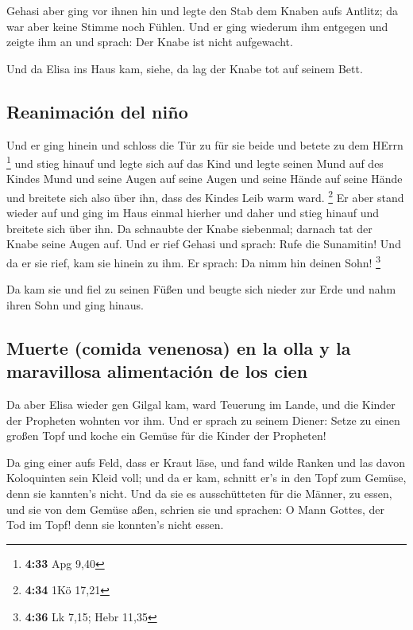  Gehasi aber ging vor ihnen hin und legte den Stab dem
Knaben aufs Antlitz; da war aber keine Stimme noch Fühlen. Und er ging
wiederum ihm entgegen und zeigte ihm an und sprach: Der Knabe ist nicht
aufgewacht.

 Und da Elisa ins Haus kam, siehe, da lag der Knabe tot
auf seinem Bett.

\hypertarget{reanimaciuxf3n-del-niuxf1o}{%
\subsection{Reanimación del niño}\label{reanimaciuxf3n-del-niuxf1o}}

 Und er ging hinein und schloss die Tür zu für sie beide
und betete zu dem HErrn \footnote{\textbf{4:33} Apg 9,40}
 und stieg hinauf und legte sich auf das Kind und legte
seinen Mund auf des Kindes Mund und seine Augen auf seine Augen und
seine Hände auf seine Hände und breitete sich also über ihn, dass des
Kindes Leib warm ward. \footnote{\textbf{4:34} 1Kö 17,21}
 Er aber stand wieder auf und ging im Haus einmal hierher
und daher und stieg hinauf und breitete sich über ihn. Da schnaubte der
Knabe siebenmal; darnach tat der Knabe seine Augen auf. 
Und er rief Gehasi und sprach: Rufe die Sunamitin! Und da er sie rief,
kam sie hinein zu ihm. Er sprach: Da nimm hin deinen Sohn! \footnote{\textbf{4:36}
  Lk 7,15; Hebr 11,35}

 Da kam sie und fiel zu seinen Füßen und beugte sich
nieder zur Erde und nahm ihren Sohn und ging hinaus.

\hypertarget{muerte-comida-venenosa-en-la-olla-y-la-maravillosa-alimentaciuxf3n-de-los-cien}{%
\subsection{Muerte (comida venenosa) en la olla y la maravillosa
alimentación de los
cien}\label{muerte-comida-venenosa-en-la-olla-y-la-maravillosa-alimentaciuxf3n-de-los-cien}}

 Da aber Elisa wieder gen Gilgal kam, ward Teuerung im
Lande, und die Kinder der Propheten wohnten vor ihm. Und er sprach zu
seinem Diener: Setze zu einen großen Topf und koche ein Gemüse für die
Kinder der Propheten!

 Da ging einer aufs Feld, dass er Kraut läse, und fand
wilde Ranken und las davon Koloquinten sein Kleid voll; und da er kam,
schnitt er's in den Topf zum Gemüse, denn sie kannten's nicht.
 Und da sie es ausschütteten für die Männer, zu essen,
und sie von dem Gemüse aßen, schrien sie und sprachen: O Mann Gottes,
der Tod im Topf! denn sie konnten's nicht essen.

